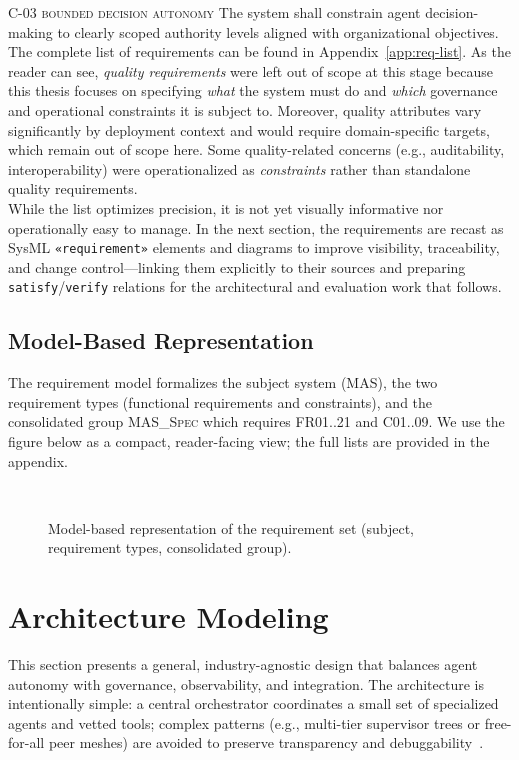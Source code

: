 \noindent \textsc{C-03 bounded decision autonomy} \quad The system shall constrain agent decision-making to clearly scoped authority levels aligned with organizational objectives. \\

The complete list of requirements can be found in Appendix~\ref{app:req-list}. As the reader can see, \emph{quality requirements} were left out of scope at this stage because this thesis focuses on specifying \emph{what} the system must do and \emph{which} governance and operational constraints it is subject to. Moreover, quality attributes vary significantly by deployment context and would require domain-specific targets, which remain out of scope here. Some quality-related concerns (e.g., auditability, interoperability) were operationalized as \emph{constraints} rather than standalone quality requirements. \\

While the list optimizes precision, it is not yet visually informative nor operationally easy to manage. In the next section, the requirements are recast as SysML \texttt{«requirement»} elements and diagrams to improve visibility, traceability, and change control—linking them explicitly to their sources and preparing \texttt{satisfy}/\texttt{verify} relations for the architectural and evaluation work that follows.

\subsection{Model-Based Representation}\label{subsec:req-model}
The requirement model formalizes the subject system (\textsc{MAS}), the two requirement types (functional requirements and constraints), and the consolidated group \textsc{MAS\_Spec} which requires FR01..21 and C01..09. We use the figure below as a compact, reader-facing view; the full lists are provided in the appendix.

\begin{figure}[h!]
  \centering
  
  \caption{Model-based representation of the requirement set (subject, requirement types, consolidated group).}~\label{fig:req-model}
\end{figure}


\section{Architecture Modeling}\label{sec:mod-mas}
This section presents a general, industry-agnostic design that balances agent autonomy with governance, observability, and integration. The architecture is intentionally simple: a central orchestrator coordinates a small set of specialized agents and vetted tools; complex patterns (e.g., multi-tier supervisor trees or free-for-all peer meshes) are avoided to preserve transparency and debuggability~\parencite{langchain_multi_agents, cognition_dont_build}.

